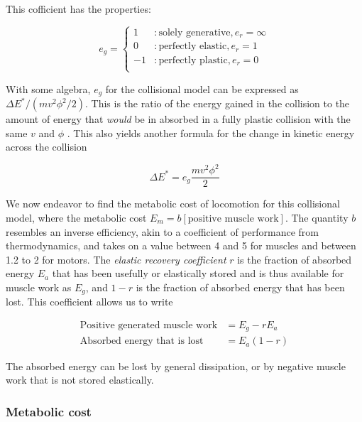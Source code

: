 This cofficient has the properties:

\begin{displaymath}
   e_{g} = \left\{
     \begin{array}{ll}
     	1 & : \mbox{solely generative}, e_{r} = \infty\\
        0 & : \mbox{perfectly elastic}, e_{r} = 1\\
       -1 & : \mbox{perfectly plastic}, e_{r} = 0\\
     \end{array}
   \right.
\end{displaymath}

With some algebra,  $e_{g}$ for the collisional model can be expressed as $\Delta E^{*} / (mv^{2}\phi^{2}/2)$. This is the ratio of the energy gained in the collision to the amount of energy that \emph{would} be in absorbed in a fully plastic collision with the same $v$ and $\phi$ \cite{ruina05}. This also yields another formula for the change in kinetic energy across the collision

\begin{equation}
\Delta E^{*} = e_{g} \frac{mv^{2} \phi^{2}}{2}
\label{eq:GenerateAbsorbKE3}
\end{equation}

We now endeavor to find the metabolic cost of locomotion for this collisional model, where the metabolic cost $E_{m} = b[\mbox{positive muscle work}]$. The quantity $b$ resembles an inverse efficiency, akin to a coefficient of performance from thermodynamics, and takes on a value between 4 and 5 for muscles and between 1.2 to 2 for motors. The \textit{elastic recovery coefficient}   $r$ is the fraction of absorbed energy $E_{a}$ that has been usefully or elastically stored and is thus available for muscle work as $E_{g}$, and $1-r$ is the fraction of absorbed energy that has been lost. This coefficient allows us to write

\begin{align}
\mbox{Positive generated muscle work} &= E_{g} - rE_{a} \\
\mbox{Absorbed energy that is lost} &= E_{a}(1-r)
\label{eq:ElasticRecovery}
\end{align}

The absorbed energy can be lost by general dissipation, or by negative muscle work that is not stored elastically.

\subsubsection*{Metabolic cost}

